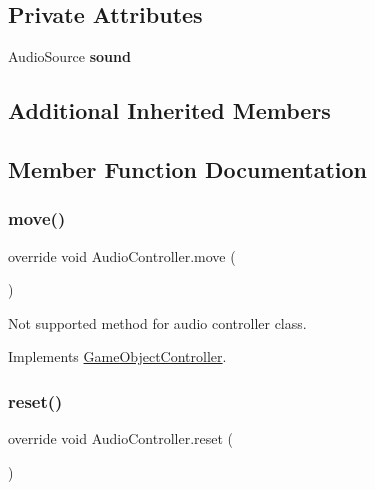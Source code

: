 \subsection*{Private Attributes}
\begin{DoxyCompactItemize}
\item 
\hypertarget{class_audio_controller_a0307fd6d05acab883b659cb267a7c152}{}\label{class_audio_controller_a0307fd6d05acab883b659cb267a7c152} 
Audio\+Source {\bfseries sound}
\end{DoxyCompactItemize}
\subsection*{Additional Inherited Members}


\subsection{Member Function Documentation}
\hypertarget{class_audio_controller_af4b01a95141dabb50d0bc39cc3abb4e6}{}\label{class_audio_controller_af4b01a95141dabb50d0bc39cc3abb4e6} 
\subsubsection{\texorpdfstring{move()}{move()}}
{\footnotesize\ttfamily override void Audio\+Controller.\+move (\begin{DoxyParamCaption}{ }\end{DoxyParamCaption})\hspace{0.3cm}{\ttfamily [virtual]}}



Not supported method for audio controller class. 



Implements \hyperlink{class_game_object_controller_a0d186d143e280869efaff7835730fc82}{Game\+Object\+Controller}.

\hypertarget{class_audio_controller_a20e52c6c93067e734270bbd3e1da204f}{}\label{class_audio_controller_a20e52c6c93067e734270bbd3e1da204f} 
\subsubsection{\texorpdfstring{reset()}{reset()}}
{\footnotesize\ttfamily override void Audio\+Controller.\+reset (\begin{DoxyParamCaption}{ }\end{DoxyParamCaption})\hspace{0.3cm}{\ttfamily [virtual]}}



